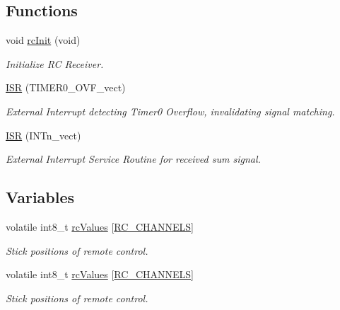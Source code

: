 \subsection*{Functions}
\begin{DoxyCompactItemize}
\item 
void \hyperlink{group__remote_gaa187b2b0f831259c5e4b7dd83b153dc4}{rc\-Init} (void)
\begin{DoxyCompactList}\small\item\em Initialize R\-C Receiver. \end{DoxyCompactList}\item 
\hyperlink{group__remote_gadd2d7cdddfb682dcc0391e60cf42c7d6}{I\-S\-R} (T\-I\-M\-E\-R0\-\_\-\-O\-V\-F\-\_\-vect)
\begin{DoxyCompactList}\small\item\em External Interrupt detecting Timer0 Overflow, invalidating signal matching. \end{DoxyCompactList}\item 
\hyperlink{group__remote_ga42903a094ebf380298719ce14486b703}{I\-S\-R} (I\-N\-Tn\-\_\-vect)
\begin{DoxyCompactList}\small\item\em External Interrupt Service Routine for received sum signal. \end{DoxyCompactList}\end{DoxyCompactItemize}
\subsection*{Variables}
\begin{DoxyCompactItemize}
\item 
volatile int8\-\_\-t \hyperlink{group__remote_gabcacf6e881a9c8d7e83e8bdf7f72dda5}{rc\-Values} \mbox{[}\hyperlink{group__remote_gaad403df27c4671b0787f75525ee666ad}{R\-C\-\_\-\-C\-H\-A\-N\-N\-E\-L\-S}\mbox{]}
\begin{DoxyCompactList}\small\item\em Stick positions of remote control. \end{DoxyCompactList}\item 
volatile int8\-\_\-t \hyperlink{group__remote_gabcacf6e881a9c8d7e83e8bdf7f72dda5}{rc\-Values} \mbox{[}\hyperlink{group__remote_gaad403df27c4671b0787f75525ee666ad}{R\-C\-\_\-\-C\-H\-A\-N\-N\-E\-L\-S}\mbox{]}
\begin{DoxyCompactList}\small\item\em Stick positions of remote control. \end{DoxyCompactList}\end{DoxyCompactItemize}


